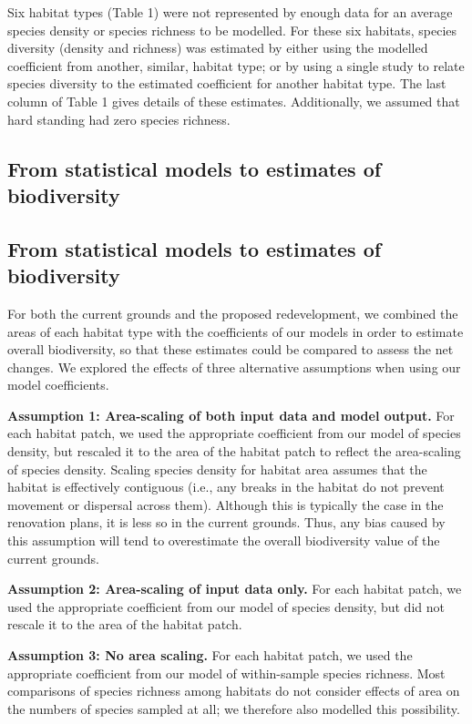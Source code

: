 Six habitat types (Table 1) were not represented by enough data for an average species density or species richness to be modelled. For these six habitats, species diversity (density and richness) was estimated by either using the modelled coefficient from another, similar, habitat type; or by using a single study to relate species diversity to the estimated coefficient for another habitat type.  The last column of Table 1 gives details of these estimates. Additionally, we assumed that hard standing had zero species richness.

\ifappendixStyle %
\subsection{From statistical models to estimates of biodiversity}%
\else
\subsection*{From statistical models to estimates of biodiversity}
\fi

For both the current grounds and the proposed redevelopment, we combined the areas of each habitat type with the coefficients of our models in order to estimate overall biodiversity, so that these estimates could be compared to assess the net changes. We explored the effects of three alternative assumptions when using our model coefficients.

\textbf{Assumption 1: Area-scaling of both input data and model output.} For each habitat patch, we used the appropriate coefficient from our model of species density, but rescaled it to the area of the habitat patch to reflect the area-scaling of species density. Scaling species density for habitat area assumes that the habitat is effectively contiguous (i.e., any breaks in the habitat do not prevent movement or dispersal across them). Although this is typically the case in the renovation plans, it is less so in the current grounds. Thus, any bias caused by this assumption will tend to overestimate the overall biodiversity value of the current grounds.

\textbf{Assumption 2: Area-scaling of input data only.} For each habitat patch, we used the appropriate coefficient from our model of species density, but did not rescale it to the area of the habitat patch. 

\textbf{Assumption 3: No area scaling.} For each habitat patch, we used the appropriate coefficient from our model of within-sample species richness. Most comparisons of species richness among habitats do not consider effects of area on the numbers of species sampled at all; we therefore also modelled this possibility.

